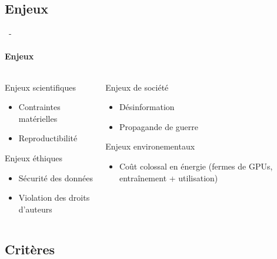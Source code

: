 \documentclass[aspectratio=169, 22pt]{beamer}
\begin{document}
\subsection{Enjeux}
\begin{frame}{\secname~- \subsecname}
  \framesubtitle{Enjeux}
  \begin{columns}
    \begin{column}{0.5\linewidth}
      \begin{customblock}{Enjeux scientifiques}
        \begin{itemize}
        \item Contraintes matérielles
        \item Reproductibilité
        \end{itemize}
      \end{customblock}
      \pause
      \begin{block}{Enjeux éthiques}
        \begin{itemize}
        \item Sécurité des données
        \item Violation des droits d'auteurs
        \end{itemize}
      \end{block}
    \end{column}
    \begin{column}{0.5\linewidth}
      \pause
      \begin{alertblock}{Enjeux de société}
        \begin{itemize}
        \item Désinformation
        \item Propagande de guerre
        \end{itemize}
      \end{alertblock}
      \pause
      \begin{exampleblock}{Enjeux environementaux}
        \begin{itemize}
        \item Coût colossal en énergie (fermes de GPUs, entraînement + utilisation)
        \end{itemize}
      \end{exampleblock}
    \end{column}
  \end{columns}
\end{frame}

\subsection{Critères}
\end{document}
